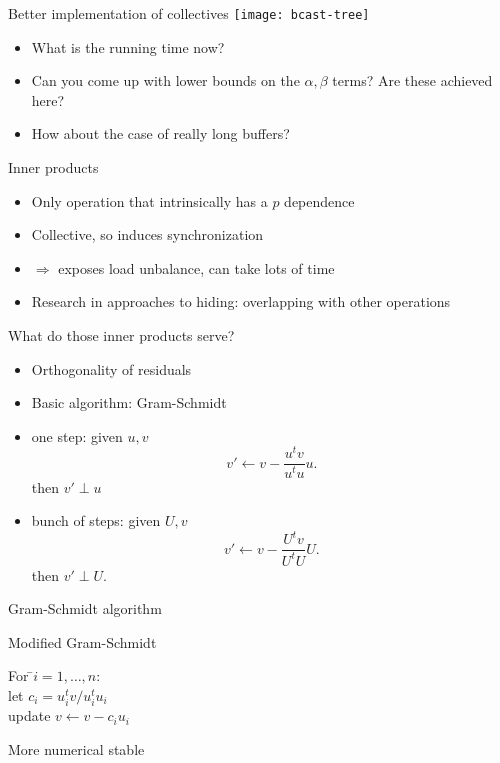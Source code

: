 \begin{frame}{Better implementation of collectives}
  \texttt{[image: bcast-tree]}
  
  \begin{itemize}
  \item<1->
    What is the running time now?
  \item<2->
    Can you come up with lower bounds on the $\alpha,\beta$ terms? Are
    these achieved here?
  \item<3-> How about the case of really long buffers?
  \end{itemize}

\end{frame}

\begin{frame}{Inner products}
  \begin{itemize}
  \item Only operation that intrinsically has a $p$ dependence
  \item Collective, so induces synchronization
  \item $\Rightarrow$ exposes load unbalance, can take lots of time
  \item Research in approaches to hiding: overlapping with other operations
  \end{itemize}
\end{frame}

\begin{frame}{What do those inner products serve?}
  \begin{itemize}
  \item Orthogonality of residuals
  \item Basic algorithm: Gram-Schmidt
  \item one step: given $u,v$
    \[ v'\leftarrow v-\frac{u^tv}{u^tu}u. \]
    then $v'\perp u$
  \item bunch of steps: given $U,v$
    \[ v'\leftarrow v-\frac{U^tv}{U^tU}U. \]
    then $v'\perp U$.
  \end{itemize}
  Gram-Schmidt algorithm
\end{frame}

\begin{frame}{Modified Gram-Schmidt}
    \begin{tabbing}
    For \=$i=1,\ldots,n$:\\
    \>let $c_i=u_i^tv/u_i^tu_i$\\
    \>update $v\leftarrow v-c_iu_i$
  \end{tabbing}

    More numerical stable
\end{frame}

